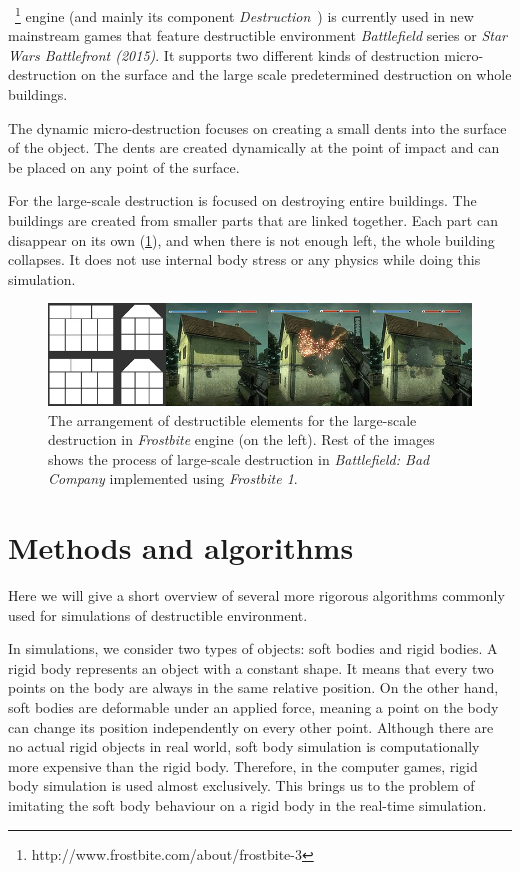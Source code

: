 ~\footnote{http://www.frostbite.com/about/frostbite-3} engine (and mainly its component \emph{Destruction}~\cite{destruction}) is currently used in new mainstream games that feature destructible environment \eg \emph{Battlefield} series or \emph{Star Wars Battlefront (2015)}. It supports two different kinds of destruction micro-destruction on the surface and the large scale predetermined destruction on whole buildings. 

The dynamic micro-destruction focuses on creating a small dents into the surface of the object. The dents are created dynamically at the point of impact and can be placed on any point of the surface.

For the large-scale destruction is focused on destroying entire buildings. The buildings are created from smaller parts that are linked together. Each part can disappear on its own (\cref{fig:frostbite}), and when there is not enough left, the whole building collapses. It does not use internal body stress or any physics while doing this simulation. 

\begin{figure}
\centering
\includegraphics[width=\textwidth]{img/frostbite}
\caption{The arrangement of destructible elements for the large-scale destruction in \emph{Frostbite} engine (on the left). Rest of the images shows the process of large-scale destruction in \emph{Battlefield: Bad Company} implemented using \emph{Frostbite 1}.}
\label{fig:frostbite}
\end{figure}

\section{Methods and algorithms}

Here we will give a short overview of several more rigorous algorithms commonly used for simulations of destructible environment. 

In simulations, we consider two types of objects: soft bodies and rigid bodies. A rigid body represents an object with a constant shape. It means that every two points on the body are always in the same relative position. On the other hand, soft bodies are deformable under an applied force, meaning a point on the body can change its position independently on every other point. Although there are no actual rigid objects in real world, soft body simulation is computationally more expensive than the rigid body. Therefore, in the computer games, rigid body simulation is used almost exclusively. This brings us to the problem of imitating the soft body behaviour on a rigid body in the real-time simulation. 

